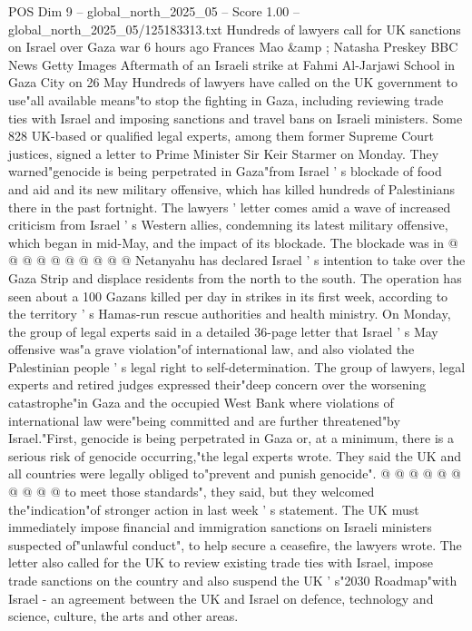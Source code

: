 \begin{textsample}{POS Dim 9 – global\_north\_2025\_05 – Score 1.00 – global\_north\_2025\_05/125183313.txt}  \label{ex:f9_pos_366}
Hundreds of lawyers call for UK sanctions on Israel over Gaza war 6 hours ago Frances Mao \&amp ; Natasha Preskey BBC News Getty Images Aftermath of an Israeli strike at Fahmi Al-Jarjawi School in Gaza City on 26 May Hundreds of lawyers have called on the UK government to use"all available means"to stop the fighting in Gaza, including reviewing trade ties with Israel and imposing sanctions and travel bans on Israeli ministers.
Some 828 UK-based or qualified legal experts, among them former Supreme Court justices, signed a letter to Prime Minister Sir Keir Starmer on Monday.
They warned"genocide is being perpetrated in Gaza"from Israel ' s blockade of food and aid and its new military offensive, which has killed hundreds of Palestinians there in the past fortnight.
The lawyers ' letter comes amid a wave of increased criticism from Israel ' s Western allies, condemning its latest military offensive, which began in mid-May, and the impact of its blockade.
The blockade was in @ @ @ @ @ @ @ @ @ @ Netanyahu has declared Israel ' s intention to take over the Gaza Strip and displace residents from the north to the south.
The operation has seen about a 100 Gazans killed per day in strikes in its first week, according to the territory ' s Hamas-run rescue authorities and health ministry.
On Monday, the group of legal experts said in a detailed 36-page letter that Israel ' s May offensive was"a grave violation"of international law, and also violated the Palestinian people ' s legal right to self-determination.
The group of lawyers, legal experts and retired judges expressed their"deep concern over the worsening catastrophe"in Gaza and the occupied West Bank where violations of international law were"being committed and are further threatened"by Israel."First, genocide is being perpetrated in Gaza or, at a minimum, there is a serious risk of genocide occurring,"the legal experts wrote.
They said the UK and all countries were legally obliged to"prevent and punish genocide". @ @ @ @ @ @ @ @ @ @ to meet those standards", they said, but they welcomed the"indication"of stronger action in last week ' s statement.
The UK must immediately impose financial and immigration sanctions on Israeli ministers suspected of"unlawful conduct", to help secure a ceasefire, the lawyers wrote.
The letter also called for the UK to review existing trade ties with Israel, impose trade sanctions on the country and also suspend the UK ' s"2030 Roadmap"with Israel - an agreement between the UK and Israel on defence, technology and science, culture, the arts and other areas.

\end{textsample}
